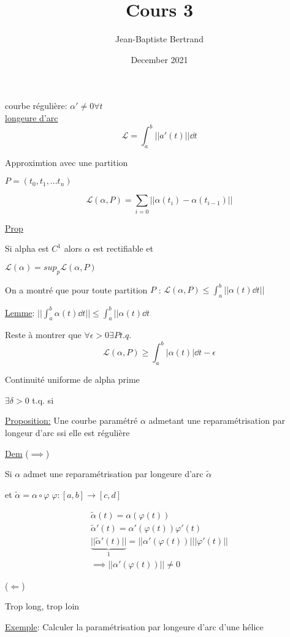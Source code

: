 \documentclass{article}
\title{Cours 3}
\author{Jean-Baptiste Bertrand}
\date{December 2021}
\begin{document}
\maketitle

courbe régulière: $\alpha' \neq 0 \forall t$\\


\underline{longeure d'arc}
$$\mathscr{L} = \int_a^b ||a'(t)|| \dd t$$

Approximtion avec une partition

$P = (t_0, t_1, ... t_n)$

$$\mathscr{L}(\alpha,P) = \sum_{i=0}||\alpha(t_i)-\alpha(t_{i-1})||$$


\underline{Prop}

Si alpha est $C^1$ alors $\alpha$ est rectifiable et 

$\mathscr{L}(\alpha) = sup_p \mathscr{L}(\alpha,P)$


On a montré que pour toute partition $P$ : $\mathscr{L}(\alpha, P) \leq \int_a^b||\alpha(t)\dd t||$

\underline{Lemme}: $||\int_a^b\alpha(t)\dd t|| \leq \int_a^b ||\alpha(t)\dd t$

Reste à montrer que $\forall \epsilon > 0 \exists P t.q.$
$$\mathscr{L}(\alpha,P) \geq \int_a^b |\alpha(t)|\dd t -\epsilon$$

Continuité uniforme de alpha prime 

$\exists \delta > 0$ t.q. si 

\underline{Proposition:} Une courbe paramétré $\alpha$ admetant une reparamétrisation par longeur d'arc ssi elle est régulière


\underline{Dem} ($\implies$)

Si $\alpha$ admet une reparamétrisation par longeure d'arc $\tilde \alpha$

et $\tilde \alpha = \alpha \circ \varphi\; \varphi:[a,b] \to [c,d]$

\begin{align*}
	\tilde \alpha(t) =\alpha (\varphi(t))\\
	\tilde \alpha'(t) =\alpha'(\varphi(t))\varphi'(t)\\
	\underbrace{||\tilde \alpha'(t)||}_1 =||\alpha'(\varphi(t))|| |\varphi'(t)||\\
	\implies ||\alpha'(\varphi(t))|| \neq 0
\end{align*}

($\Longleftarrow$)

Trop long, trop loin

\underline{Exemple}: Calculer la paramétrisation par longeure d'arc d'une hélice 
\end{document}
